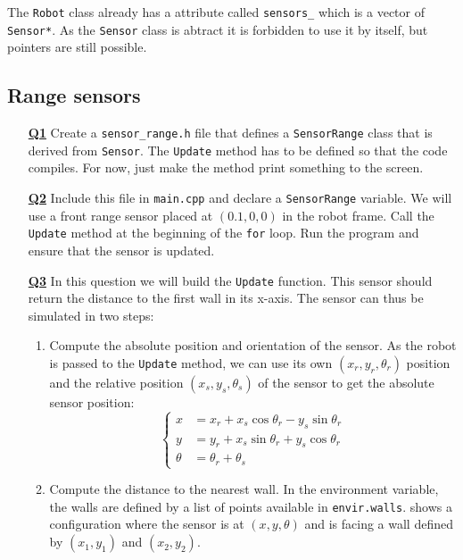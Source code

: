 \documentclass{ecnreport}
\begin{document}
The \texttt{Robot} class already has a attribute called \texttt{sensors\_} which is a vector of \texttt{Sensor*}. As the \texttt{Sensor} class is abtract it is forbidden to use it by itself, but pointers are still possible.


\subsection{Range sensors}


\begin{itemize}
\medskip\item[\textbf{\underline{Q1}}] Create a \texttt{sensor\_range.h} file that defines a \texttt{SensorRange} class that is derived from \texttt{Sensor}. The \texttt{Update} method has to be defined so that the code compiles. For now, just make the method print something to the screen.

\medskip\item[\textbf{\underline{Q2}}] Include this file in \texttt{main.cpp} and declare a \texttt{SensorRange} variable.  We will use a front range sensor placed at $(0.1, 0,0)$ in the robot frame. Call the \texttt{Update} method at the beginning of the \texttt{for} loop. Run the program and ensure that the sensor is updated.

\medskip\item[\textbf{\underline{Q3}}] In this question we will build the \texttt{Update} function. This sensor should return the distance to the first wall in its x-axis. The sensor can thus be simulated in two steps:
\begin{enumerate}
\item Compute the absolute position and orientation of the sensor. As the robot is passed to the \texttt{Update} method, we can use its own $(x_r,y_r,\theta_r)$ position and the relative position $(x_s,y_s,\theta_s)$ of the sensor to get the absolute sensor position:
\begin{equation}
\left\{\begin{array}{ll}
x &= x_r + x_s\cos\theta_r - y_s\sin\theta_r \\
y &= y_r + x_s\sin\theta_r + y_s\cos\theta_r \\
\theta &= \theta_r + \theta_s
\end{array}\right.
\end{equation}
\item Compute the distance to the nearest wall. In the environment variable, the walls are defined by a list of points available in \texttt{envir.walls}.  shows a configuration where the sensor is at $(x,y,\theta)$ and is facing a wall defined by $(x_1,y_1)$ and $(x_2,y_2)$.


\end{enumerate}
\end{itemize}
\end{document}
